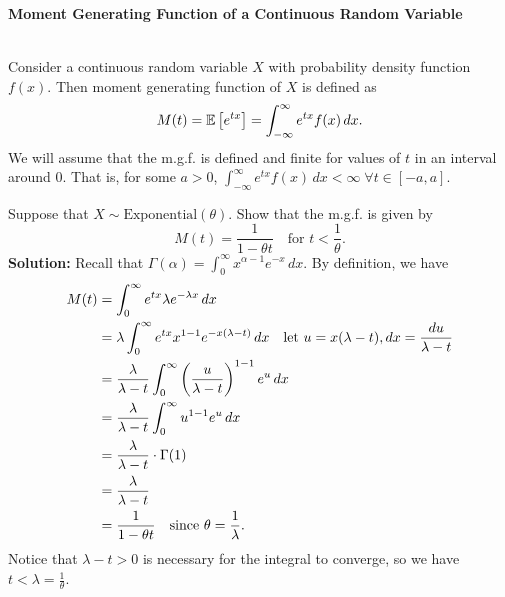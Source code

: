 \pagebreak

\textbf{Moment Generating Function of a Continuous Random Variable}

\begin{definition}
    \phantom{}\\
    Consider a continuous random variable $X$ with probability density function $f(x)$. Then moment generating function of $X$ is defined as
    \vspace{-3mm}
    \[
        M(t) = \mathbb{E}\left[{e^{tx}}\right] = \displaystyle \int_{-\infty}^{\infty} e^{tx} f(x) \, dx.
    \]
    We will assume that the m.g.f. is defined and finite for values of $t$ in an interval around 0. That is, for some $a > 0$, $\displaystyle \int_{-\infty}^{\infty} e^{tx} f(x) \, dx < \infty \; \forall t \in [-a,a]$.
\end{definition}

\begin{example}
    Suppose that $X \sim \text{Exponential}(\theta)$. Show that the m.g.f. is given by \vspace{-3mm}
    \[
        M(t) = \frac{1}{1 - \theta t} \quad \text{for $t < \frac{1}{\theta}$}.
    \]
    \textbf{Solution:} Recall that $\Gamma(\alpha) = \displaystyle \int_{0}^{\infty} x^{\alpha -1} e^{-x} \, dx$. By definition, we have \vspace{-3mm}
    \begin{align*}
        M(t) &= \displaystyle \int_{0}^{\infty} e^{tx} \lambda e^{-\lambda x} \, dx \\
        &= \lambda \displaystyle \int_{0}^{\infty} e^{tx} x^{1-1} e^{-x(\lambda - t)} \, dx \quad \text{let $u = x(\lambda - t)$}, dx = \frac{du}{\lambda - t} \\
        &= \displaystyle \frac{\lambda}{\lambda - t} \displaystyle \int_{0}^{\infty} \left( \frac{u}{\lambda - t} \right)^{1-1} e^u \, dx \\
        &= \displaystyle \frac{\lambda}{\lambda - t} \displaystyle \int_{0}^{\infty} u^{1-1} e^u \, dx \\
        &= \displaystyle \frac{\lambda}{\lambda - t} \cdot \Gamma(1) \\
        &= \displaystyle \frac{\lambda}{\lambda - t} \\
        &= \displaystyle \frac{1}{1 - \theta t} \quad \text{since $\theta = \frac{1}{\lambda}$}.
    \end{align*}
    Notice that $\lambda - t > 0$ is necessary for the integral to converge, so we have $t < \lambda = \frac{1}{\theta}$.
\end{example}

